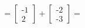 \documentclass[preview]{standalone}
\begin{document}
\begin{align*}
= \begin{bmatrix} \text{-}1 \\ 2 \end{bmatrix} + \begin{bmatrix} \text{-}2 \\ \text{-}3 \end{bmatrix}=
\end{align*}
\end{document}
